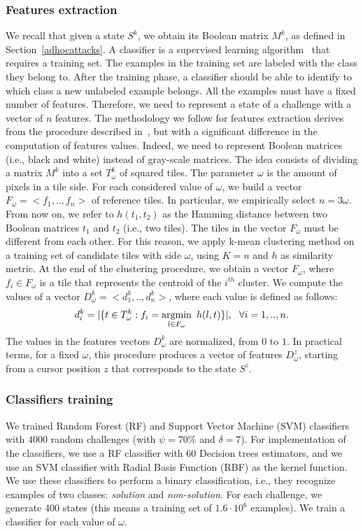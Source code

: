 \documentclass[conference]{IEEEtran}
\begin{document}
\subsubsection{Features extraction}
\label{featuresextraction}
We recall that given a state $S^k$, we obtain its Boolean matrix $M^k$, as defined in Section~\ref{adhocattacks}.
A classifier is a supervised learning algorithm~\cite{kotsiantis2007supervised} that requires a training set. The examples in the training set are labeled with the class they belong to. After the training phase, a classifier should be able to identify to which class a new unlabeled example belongs.
All the examples must have a fixed number of features.
Therefore, we need to represent a state of a challenge with a vector of $n$ features.
The methodology we follow for features extraction derives from
the procedure described in~\cite{golle2008machine}, but with a significant difference in the computation of features values. Indeed, we need to represent Boolean matrices (i.e., black and white) instead of gray-scale matrices. The idea consists of dividing a matrix $M^k$ into a set $T^k_\omega$ of squared tiles. The parameter $\omega$ is the amount of pixels in a tile side.
For each considered value of $\omega$, we build a vector $F_\omega=<f_1,..,f_n>$ of reference tiles.
In particular, we empirically select $n = 3 \omega$. From now on, we refer to $h(t_1,t_2)$ as the Hamming distance between two Boolean matrices $t_1$ and $t_2$ (i.e., two tiles).
The tiles in the vector $F_\omega$ must be different from each other. 
For this reason, 
we apply k-mean clustering method on a training set of candidate tiles with side $\omega$, using $K=n$ and $h$ as similarity metric.
At the end of the clustering procedure, we obtain a vector $F_\omega$, where $f_i \in F_\omega$ is a tile that represents the centroid of the $i^{th}$ cluster.
We compute the values of a vector $D^k_\omega=<d^k_1,..,d^k_n>$, where each value is defined as follows: \newcommand{\argmin}{\operatornamewithlimits{argmin}}
\newcommand{\argmax}{\operatornamewithlimits{argmax}}
$$d^k_{i} = | \{ t \in T^k_{\omega} : f_i = \argmin_{{l}\in F_\omega}\ h({l},t) \}|,\ \ \forall i = 1,..,n.$$ The values in the features vectors $D^k_\omega$ are normalized, from $0$ to $1$. In practical terms, for a fixed $\omega$, this procedure produces a vector of features $D^z_\omega$, starting from a cursor position $z$ that corresponds to the state $S^z$. 

\subsubsection{Classifiers training}
\label{classifiertraining}
We trained Random Forest (RF) and Support Vector Machine (SVM) classifiers with $4000$ random challenges (with $\psi=70\%$ and $\delta=7$).
For implementation of the classifiers, we use a RF classifier with $60$ Decision trees estimators, and we use an SVM classifier with Radial Basis Function (RBF) as the kernel function.
We use these classifiers to perform a binary classification, i.e., they recognize examples of two classes: \textit{solution} and \textit{non-solution}.
For each challenge, we generate $400$ states (this means a training set of $1.6 \cdot 10^6$ examples).
We train a classifier for each value of $\omega$.
\end{document}
